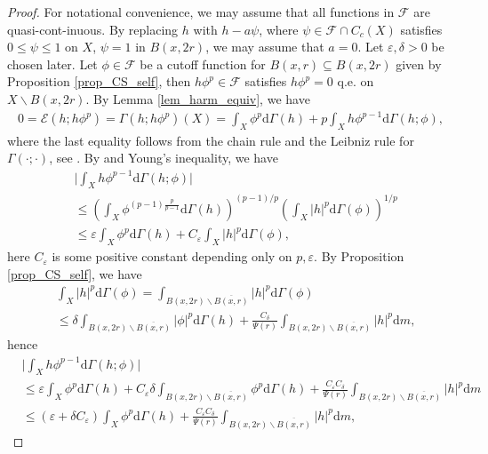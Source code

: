 \documentclass[11pt,a4paper]{article}
\numberwithin{equation}{section}
\theoremstyle{plain}
\theoremstyle{definition}
\begin{document}
\begin{proof}
For notational convenience, we may assume that all functions in $\mathcal{F}$ are quasi-cont-inuous. By replacing $h$ with $h-a\psi$, where $\psi\in\mathcal{F}\cap C_c(X)$ satisfies $0\le\psi\le1$ on $X$, $\psi=1$ in $B(x,2r)$, we may assume that $a=0$. Let $\varepsilon, \delta>0$ be chosen later. Let $\phi\in\mathcal{F}$ be a cutoff function for $B(x,r)\subseteq B(x,2r)$ given by Proposition \ref{prop_CS_self}, then $h\phi^p\in\mathcal{F}$ satisfies $h\phi^p=0$ q.e. on $X\backslash B(x,2r)$. By Lemma \ref{lem_harm_equiv}, we have
\begin{align*}
0=\mathcal{E}(h;h\phi^p)=\Gamma(h;h\phi^p)(X)=\int_{X}{\phi}^p\mathrm{d}\Gamma(h)+p\int_X{h}\phi^{p-1}\mathrm{d}\Gamma(h;\phi),
\end{align*}
where the last equality follows from the chain rule and the Leibniz rule for $\Gamma(\cdot;\cdot)$, see \cite[Theorem 4.15 (b), Theorem 5.12, Definition 4.14]{KS24a}. By \cite[Proposition 4.8]{KS24a} and Young's inequality, we have
\begin{align*}
&\lvert\int_X{h}\phi^{p-1}\mathrm{d}\Gamma(h;\phi)\rvert\\
&\le\left(\int_X\phi^{(p-1)\frac{p}{p-1}}\mathrm{d}\Gamma(h)\right)^{(p-1)/p}\left(\int_X|h|^p\mathrm{d}\Gamma(\phi)\right)^{1/p}\\
&\le\varepsilon\int_X\phi^p\mathrm{d}\Gamma(h)+C_\varepsilon\int_X|h|^p\mathrm{d}\Gamma(\phi),
\end{align*}
here $C_\varepsilon$ is some positive constant depending only on $p, \varepsilon$. By Proposition \ref{prop_CS_self}, we have
\begin{align*}
&\int_X|h|^p\mathrm{d}\Gamma(\phi)=\int_{B(x,2r)\backslash\overline{B(x,r)}}|h|^p\mathrm{d}\Gamma(\phi)\\
&\le\delta\int_{B(x,2r)\backslash\overline{B(x,r)}}|\phi|^p\mathrm{d}\Gamma(h)+\frac{C_\delta}{\Psi(r)}\int_{B(x,2r)\backslash\overline{B(x,r)}}|h|^p\mathrm{d} m,
\end{align*}
hence
\begin{align*}
&\lvert\int_X{h}\phi^{p-1}\mathrm{d}\Gamma(h;\phi)\rvert\\
&\le \varepsilon\int_X\phi^p\mathrm{d}\Gamma(h)+C_\varepsilon \delta\int_{B(x,2r)\backslash\overline{B(x,r)}}\phi^p\mathrm{d}\Gamma(h)+\frac{C_\varepsilon C_\delta }{\Psi(r)}\int_{B(x,2r)\backslash\overline{B(x,r)}}|h|^p\mathrm{d} m\\
&\le(\varepsilon+\delta C_\varepsilon)\int_X\phi^p\mathrm{d}\Gamma(h)+\frac{C_\varepsilon C_\delta }{\Psi(r)}\int_{B(x,2r)\backslash\overline{B(x,r)}}|h|^p\mathrm{d} m,

\end{align*}
\end{proof}
\end{document}
